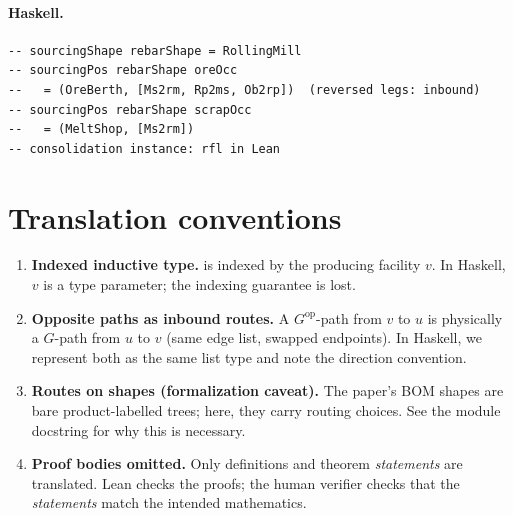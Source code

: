\documentclass[11pt,a4paper]{article}
\begin{document}
\paragraph{Haskell.}
\begin{lstlisting}[style=haskell]
-- sourcingShape rebarShape = RollingMill
-- sourcingPos rebarShape oreOcc
--   = (OreBerth, [Ms2rm, Rp2ms, Ob2rp])  (reversed legs: inbound)
-- sourcingPos rebarShape scrapOcc
--   = (MeltShop, [Ms2rm])
-- consolidation instance: rfl in Lean
\end{lstlisting}


\section{Translation conventions}

\begin{enumerate}
\item \textbf{Indexed inductive type.}   is indexed by the
  producing facility $v$.  In Haskell, $v$ is a type parameter; the indexing
  guarantee is lost.

\item \textbf{Opposite paths as inbound routes.}  A $G^{\mathrm{op}}$-path from
  $v$ to $u$ is physically a $G$-path from $u$ to $v$ (same edge list, swapped
  endpoints).  In Haskell, we represent both as the same list type and note the
  direction convention.

\item \textbf{Routes on shapes (formalization caveat).}  The paper's BOM shapes
  are bare product-labelled trees; here, they carry routing choices.  See the
  module docstring for why this is necessary.

\item \textbf{Proof bodies omitted.}  Only definitions and theorem
  \emph{statements} are translated.  Lean checks the proofs; the human
  verifier checks that the \emph{statements} match the intended mathematics.
\end{enumerate}
\end{document}
